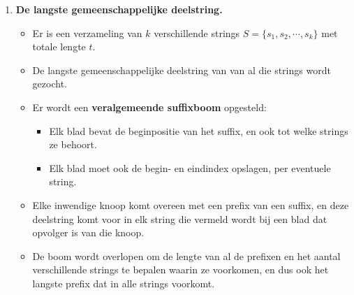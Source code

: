 \begin{itemize}
\begin{enumerate}
        \item \textbf{De langste gemeenschappelijke deelstring.}
        \begin{itemize}
            \item Er is een verzameling van $k$ verschillende strings $S = \{s_1, s_2, \cdots, s_k\}$ met totale lengte $t$.
            \item De langste gemeenschappelijke deelstring van van al die strings wordt gezocht.
            \item Er wordt een \textbf{veralgemeende suffixboom} opgesteld:
            \begin{itemize}
                \item Elk blad bevat de beginpositie van het suffix, en ook tot welke strings ze behoort.
                \item Elk blad moet ook de begin- en eindindex opslagen, per eventuele string.
            \end{itemize}
            \item Elke inwendige knoop komt overeen met een prefix van een suffix, en deze deelstring komt voor in elk string die vermeld wordt bij een blad dat opvolger is van die knoop.
            \item De boom wordt overlopen om de lengte van al de prefixen en het aantal verschillende strings te bepalen waarin ze voorkomen, en dus ook het langste prefix dat in alle strings voorkomt.
        \end{itemize}
        
    \end{enumerate}
\end{itemize}

